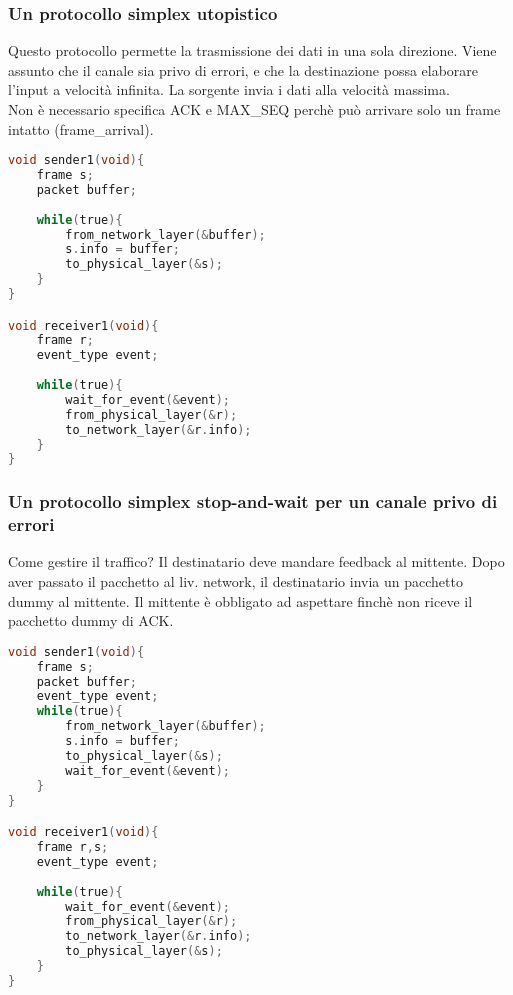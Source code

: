 \documentclass{article}
\begin{document}
\subsubsection{Un protocollo simplex utopistico}
Questo protocollo permette la trasmissione dei dati in una sola direzione. Viene assunto che il canale sia privo di errori, e che la destinazione possa elaborare l'input a velocità infinita. La sorgente invia i dati alla velocità massima.\\
Non è necessario specifica ACK e MAX\_SEQ perchè può arrivare solo un frame intatto (frame\_arrival).
\begin{lstlisting}[language=C, caption=simplex utopistico]
void sender1(void){
	frame s;
	packet buffer;
	
	while(true){
		from_network_layer(&buffer);
		s.info = buffer;
		to_physical_layer(&s);
	}
}

void receiver1(void){
	frame r;
	event_type event;
	
	while(true){
		wait_for_event(&event);
		from_physical_layer(&r);
		to_network_layer(&r.info);
	}
}
\end{lstlisting}
\subsubsection{Un protocollo simplex stop-and-wait per un canale privo di errori}
Come gestire il traffico? Il destinatario deve mandare feedback al mittente.  Dopo aver passato il pacchetto al liv. network, il destinatario invia un pacchetto dummy al mittente.  Il mittente è obbligato ad aspettare finchè non riceve il pacchetto dummy di ACK. 
\begin{lstlisting}[language=C, caption=simplex stop-and-wait senza errori]
void sender1(void){
	frame s;
	packet buffer;
	event_type event;
	while(true){
		from_network_layer(&buffer);
		s.info = buffer;
		to_physical_layer(&s);
		wait_for_event(&event);
	}
}

void receiver1(void){
	frame r,s;
	event_type event;
	
	while(true){
		wait_for_event(&event);
		from_physical_layer(&r);
		to_network_layer(&r.info);
		to_physical_layer(&s);
	}
}
\end{lstlisting}
\end{document}
